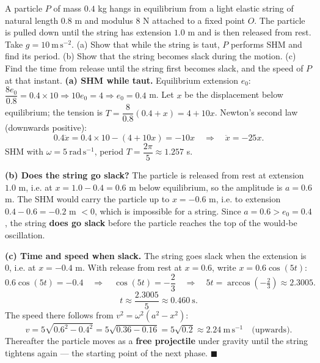 \documentclass[11pt]{article}
\begin{document}
\begin{exoresolu}
A particle $P$ of mass $0.4$ kg hangs in equilibrium from a light elastic string of natural length $0.8$ m and modulus $8$ N attached to a fixed point $O$. The particle is pulled down until the string has extension $1.0$ m and is then released from rest. Take $g = 10\ \mathrm{m\,s^{-2}}$. (a) Show that while the string is taut, $P$ performs SHM and find its period. (b) Show that the string becomes slack during the motion. (c) Find the time from release until the string first becomes slack, and the speed of $P$ at that instant.
\tcblower
\textbf{(a) SHM while taut.} Equilibrium extension $e_{0}$: $\dfrac{8e_{0}}{0.8} = 0.4 \times 10 \Rightarrow 10e_{0} = 4 \Rightarrow e_{0} = 0.4$ m. Let $x$ be the displacement below equilibrium; the tension is $T = \dfrac{8}{0.8}(0.4 + x) = 4 + 10x$. Newton's second law (downwards positive):
\[ 0.4\ddot{x} = 0.4 \times 10 - (4 + 10x) = -10x \quad\Longrightarrow\quad \ddot{x} = -25x. \]
SHM with $\omega = 5\ \mathrm{rad\,s^{-1}}$, period $T = \dfrac{2\pi}{5} \approx 1.257$ s.

\textbf{(b) Does the string go slack?} The particle is released from rest at extension $1.0$ m, i.e. at $x = 1.0 - 0.4 = 0.6$ m below equilibrium, so the amplitude is $a = 0.6$ m. The SHM would carry the particle up to $x = -0.6$ m, i.e. to extension $0.4 - 0.6 = -0.2$ m $< 0$, which is impossible for a string. Since $a = 0.6 > e_{0} = 0.4$, the string \textbf{does go slack} before the particle reaches the top of the would-be oscillation.

\textbf{(c) Time and speed when slack.} The string goes slack when the extension is $0$, i.e. at $x = -0.4$ m. With release from rest at $x = 0.6$, write $x = 0.6\cos(5t)$:
\[ 0.6\cos(5t) = -0.4 \quad\Longrightarrow\quad \cos(5t) = -\frac{2}{3} \quad\Longrightarrow\quad 5t = \arccos\left(-\tfrac{2}{3}\right) \approx 2.3005. \]
\[ t \approx \frac{2.3005}{5} \approx 0.460\ \mathrm{s}. \]
The speed there follows from $v^{2} = \omega^{2}(a^{2} - x^{2})$:
\[ v = 5\sqrt{0.6^{2} - 0.4^{2}} = 5\sqrt{0.36 - 0.16} = 5\sqrt{0.2} \approx 2.24\ \mathrm{m\,s^{-1}} \quad \text{(upwards).} \]
Thereafter the particle moves as a \textbf{free projectile} under gravity until the string tightens again — the starting point of the next phase. $\blacksquare$
\end{exoresolu}
\end{document}
